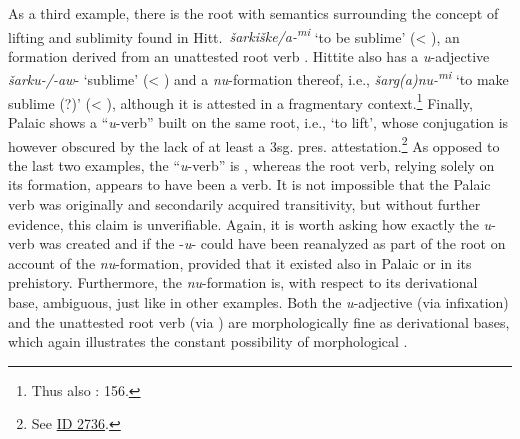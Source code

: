 \documentclass[output=paper,colorlinks,citecolor=brown]{langscibook}
\begin{document}
As a third example, there is the root  with semantics surrounding the concept of lifting and sublimity found in Hitt.\ \textit{šarkiške/a-\textsuperscript{mi}} ‘to be sublime’ (< ), an  formation derived from an unattested root verb . Hittite also has a \textit{u}-adjective \textit{šarku-/-aw}- ‘sublime’ (< ) and a \textit{nu}-formation thereof, i.e., \textit{šarg(a)nu-\textsuperscript{mi}} ‘to make sublime (?)’ (< ), although it is attested in a fragmentary context.\footnote{Thus also \citealt{Luraghi1992}: 156.} Finally, Palaic shows a “\textit{u}-verb” built on the same root, i.e.,  ‘to lift’, whose conjugation is however obscured by the lack of at least a 3sg. pres. attestation.\footnote{See   \href{http://www.ediana.gwi.uni-muenchen.de/dictionary.php?lemma=2736}{ID 2736}.} As opposed to the last two examples, the “\textit{u}-verb” is , whereas the root verb, relying solely on its  formation, appears to have been a  verb. It is not impossible that the Palaic verb  was originally  and secondarily acquired transitivity, but without further evidence, this claim is unverifiable. Again, it is worth asking how exactly the \textit{u}-verb  was created and if the -\textit{u}- could have been reanalyzed as part of the root on account of the \textit{nu}-formation, provided that it existed also in Palaic or in its prehistory. Furthermore, the \textit{nu}-formation is, with respect to its derivational base, ambiguous, just like in other examples. Both the \textit{u}-adjective (via infixation) and the unattested root verb (via ) are morphologically fine as derivational bases, which again illustrates the constant possibility of morphological .
\end{document}
